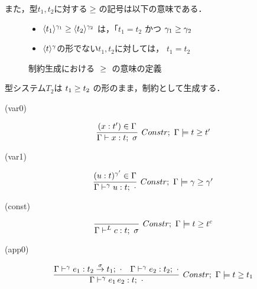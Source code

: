 また，型$t_1, t_2$に対する${} \ge {}$の記号は以下の意味である．

\begin{figure}[H]
  \centering
  \begin{itemize}
  \item ${\langle{t_1}\rangle^{\gamma_1}} \ge {\langle{t_2}\rangle^{\gamma_2}}$
    は，「$t_1=t_2$ かつ ${\gamma_1} \ge {\gamma_2}$
  \item $\langle{t}\rangle^{\gamma}$の形でない$t_1,t_2$に対しては，
    $t_1 = t_2$
  \end{itemize}

  \caption{制約生成における ${} \ge {}$ の意味の定義}
  \label{fig:typeinf_longer_def}
\end{figure}

型システム$T_2$は ${t_1} \ge {t_2}$ の形のまま，制約として生成する．






(var0)

\[
  \infer[Constr;~\Gamma \models \longer{t}{t'}]
  {\Gamma \vdash x:t;~\sigma}
  {(x:t') \in \Gamma
  }
\]

(var1)

\[
  \infer[Constr;~\Gamma \models \longer{\gamma}{\gamma'}]
  {\Gamma \vdash^{\gamma} u:t;~\cdot}
  {(u:t)^{\gamma'} \in \Gamma
  }
\]

(const)

\[
  \infer[Constr;~\Gamma \models \longer{t}{t^c}]
  {\Gamma \vdash^{L} c:t;~\sigma}
  {}
\]

(app0)

\[
  \infer[Constr;~\Gamma \models \longer{t}{t_1}]
  {\Gamma \vdash^\gamma e_1 \, e_2 : t;~\cdot}
  {\Gamma \vdash^\gamma e_1 : \funT{t_2}{t_1}{\sigma};~\cdot
    &\Gamma \vdash^\gamma e_2 : t_2;~\cdot
  }
\]

